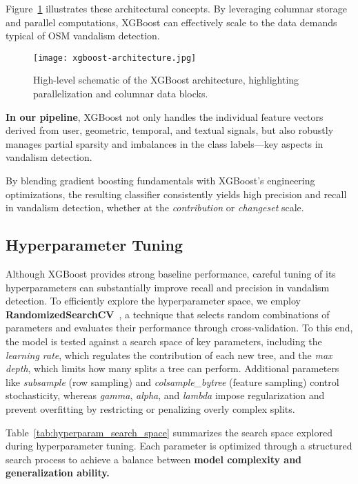 \documentclass[
    13pt, %
    a4paper, %
    listof=totoc, %
    bibliography=totoc, %
    index=totoc, %
    headsepline
]{scrreprt}
\begin{document}
\noindent
Figure~\ref{fig:xgboost_architecture} illustrates these architectural concepts. By leveraging columnar storage and parallel computations, XGBoost can effectively scale to the data demands typical of OSM vandalism detection.


\begin{figure}[H]
    \centering
    \texttt{[image: xgboost-architecture.jpg]}
    \caption{High-level schematic of the XGBoost architecture, highlighting parallelization and columnar data blocks.~\cite{tutorialspoint2025}}
    \label{fig:xgboost_architecture}
\end{figure}

\noindent
\textbf{In our pipeline}, XGBoost not only handles the individual feature vectors derived from user,
geometric, temporal, and textual signals, but also robustly manages partial sparsity
and imbalances in the class labels—key aspects in vandalism detection.

By blending gradient boosting fundamentals with XGBoost’s engineering optimizations, the resulting classifier consistently yields high precision and recall in vandalism detection, whether at the \emph{contribution} or \emph{changeset} scale.

\subsection{Hyperparameter Tuning}
\label{sec:hyperparameter_tuning}

Although XGBoost provides strong baseline performance, careful tuning of its hyperparameters can substantially improve recall and precision in vandalism detection. To efficiently explore the hyperparameter space, we employ \textbf{RandomizedSearchCV}~\cite{bergstra2012random}, a technique that selects random combinations of parameters and evaluates their performance through cross-validation. To this end, the model is tested against a search space of key parameters, including the \emph{learning rate}, which regulates the contribution of each new tree, and the \emph{max depth}, which limits how many splits a tree can perform. Additional parameters like \emph{subsample} (row sampling) and \emph{colsample\_bytree} (feature sampling) control stochasticity, whereas \emph{gamma}, \emph{alpha}, and \emph{lambda} impose regularization and prevent overfitting by restricting or penalizing overly complex splits.

Table~\ref{tab:hyperparam_search_space} summarizes the search space explored during hyperparameter tuning. Each parameter is optimized through a structured search process to achieve a balance between \textbf{model complexity and generalization ability.}
\end{document}
